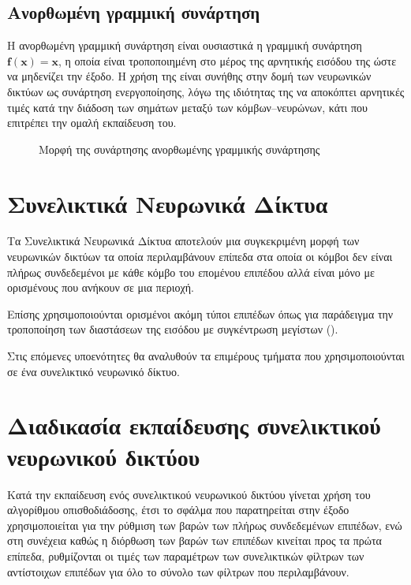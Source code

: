 \subsection{Ανορθωμένη γραμμική συνάρτηση }
Η ανορθωμένη γραμμική συνάρτηση  είναι ουσιαστικά η γραμμική συνάρτηση $\mathit{\mathbf{f\left(x\right) = x}}$, η οποία είναι τροποποιημένη στο μέρος της αρνητικής εισόδου της ώστε να μηδενίζει την έξοδο. Η χρήση της είναι συνήθης στην δομή των νευρωνικών δικτύων ως συνάρτηση ενεργοποίησης, λόγω της ιδιότητας της να αποκόπτει αρνητικές τιμές κατά την διάδοση των σημάτων μεταξύ των κόμβων--νευρώνων, κάτι που επιτρέπει την ομαλή εκπαίδευση του.

\begin{figure}[H]
  \begin{center}
    
    \caption{Μορφή της συνάρτησης ανορθωμένης γραμμικής συνάρτησης }
  \end{center}
\end{figure}

\section{Συνελικτικά Νευρωνικά Δίκτυα}
Τα Συνελικτικά Νευρωνικά Δίκτυα αποτελούν μια συγκεκριμένη μορφή των νευρωνικών δικτύων τα οποία περιλαμβάνουν επίπεδα στα οποία οι κόμβοι δεν είναι πλήρως συνδεδεμένοι με κάθε κόμβο του επομένου επιπέδου αλλά είναι μόνο με ορισμένους που ανήκουν σε μια περιοχή. 

Επίσης χρησιμοποιούνται ορισμένοι ακόμη τύποι επιπέδων όπως για παράδειγμα την τροποποίηση των διαστάσεων της εισόδου με συγκέντρωση μεγίστων ().

Στις επόμενες υποενότητες θα αναλυθούν τα επιμέρους τμήματα που χρησιμοποιούνται σε ένα συνελικτικό νευρωνικό δίκτυο.

\section{Διαδικασία εκπαίδευσης συνελικτικού νευρωνικού δικτύου}
Κατά την εκπαίδευση ενός συνελικτικού νευρωνικού δικτύου γίνεται χρήση του αλγορίθμου οπισθοδιάδοσης, έτσι το σφάλμα που παρατηρείται στην έξοδο χρησιμοποιείται για την ρύθμιση των βαρών των πλήρως συνδεδεμένων επιπέδων, ενώ στη συνέχεια καθώς η διόρθωση των βαρών των επιπέδων κινείται προς τα πρώτα επίπεδα, ρυθμίζονται οι τιμές των παραμέτρων των συνελικτικών φίλτρων των αντίστοιχων επιπέδων για όλο το σύνολο των φίλτρων που περιλαμβάνουν.\\

